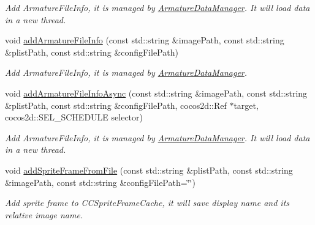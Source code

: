 \begin{DoxyCompactItemize}
\begin{DoxyCompactList}\small\item\em Add Armature\+File\+Info, it is managed by \hyperlink{classcocostudio_1_1ArmatureDataManager}{Armature\+Data\+Manager}. It will load data in a new thread. \end{DoxyCompactList}\item 
\mbox{\label{classcocostudio_1_1ArmatureDataManager_aa2580efec928c88513b321b66b3977e0}} 
void \hyperlink{classcocostudio_1_1ArmatureDataManager_aa2580efec928c88513b321b66b3977e0}{add\+Armature\+File\+Info} (const std\+::string \&image\+Path, const std\+::string \&plist\+Path, const std\+::string \&config\+File\+Path)
\begin{DoxyCompactList}\small\item\em Add Armature\+File\+Info, it is managed by \hyperlink{classcocostudio_1_1ArmatureDataManager}{Armature\+Data\+Manager}. \end{DoxyCompactList}\item 
\mbox{\label{classcocostudio_1_1ArmatureDataManager_ae4bd5cc9b48209df7869dc027c5d2550}} 
void \hyperlink{classcocostudio_1_1ArmatureDataManager_ae4bd5cc9b48209df7869dc027c5d2550}{add\+Armature\+File\+Info\+Async} (const std\+::string \&image\+Path, const std\+::string \&plist\+Path, const std\+::string \&config\+File\+Path, cocos2d\+::\+Ref $\ast$target, cocos2d\+::\+S\+E\+L\+\_\+\+S\+C\+H\+E\+D\+U\+LE selector)
\begin{DoxyCompactList}\small\item\em Add Armature\+File\+Info, it is managed by \hyperlink{classcocostudio_1_1ArmatureDataManager}{Armature\+Data\+Manager}. It will load data in a new thread. \end{DoxyCompactList}\item 
\mbox{\label{classcocostudio_1_1ArmatureDataManager_aa878105ec4cd7dbfb415864a13bd908e}} 
void \hyperlink{classcocostudio_1_1ArmatureDataManager_aa878105ec4cd7dbfb415864a13bd908e}{add\+Sprite\+Frame\+From\+File} (const std\+::string \&plist\+Path, const std\+::string \&image\+Path, const std\+::string \&config\+File\+Path=\char`\"{}\char`\"{})
\begin{DoxyCompactList}\small\item\em Add sprite frame to C\+C\+Sprite\+Frame\+Cache, it will save display name and it\textquotesingle{}s relative image name. \end{DoxyCompactList}\item 

\end{DoxyCompactItemize}
